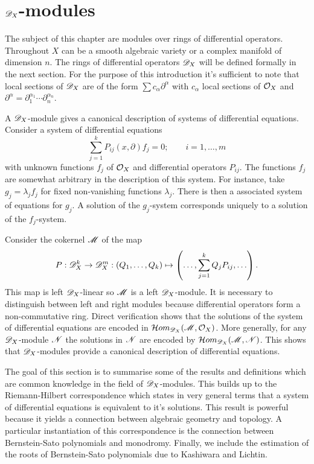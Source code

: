 \chapter{$\mathscr{D}_X$-modules}\label{Ch: ChapterDX}
The subject of this chapter are modules over rings of differential operators.
Throughout $X$ can be a smooth algebraic variety or a complex manifold of dimension $n$.
The rings of differential operators $\mathscr{D}_X$ will be defined formally in the next section.
For the purpose of this introduction it's sufficient to note that local sections of $\mathscr{D}_X$ are of the form $\sum c_{\alpha } \partial^\alpha$ with $c_{\alpha}$ local sections of $\mathcal{O}_X$ and $\partial^\alpha = \partial_1^{\alpha_1}\cdots \partial_n^{\alpha_n}$.

A $\mathscr{D}_X$-module gives a canonical description of systems of differential equations.
Consider a system of differential equations
$$\sum_{j=1}^k P_{ij}(x,\partial) f_j = 0; \qquad i= 1,\ldots,m$$
with unknown functions $f_j$ of $\mathcal{O}_X$ and differential operators $P_{ij}$.
The functions $f_j$ are somewhat arbitrary in the description of this system.
For instance, take $g_j=\lambda_j f_j$ for fixed non-vanishing functions $\lambda_j$.
There is then a associated system of equations for $g_j$.
A solution of the $g_j$-system corresponds uniquely to a solution of the $f_j$-system.

Consider the cokernel $\mathscr{M}$ of the map
$$P:\mathscr{D}_X^k \to \mathscr{D}_X^m : \left(Q_1,\ldots, Q_k\right) \mapsto \left(\ldots, \sum_{j=1}^k Q_j P_{ij},\ldots\right).$$
This map is left $\mathscr{D}_X$-linear so $\mathscr{M}$ is a left $\mathscr{D}_X$-module.
It is necessary to distinguish between left and right modules because differential operators form a non-commutative ring.
Direct verification shows that the solutions of the system of differential equations are encoded in $\mathcal{H}om_{\mathscr{D}_X}(\mathscr{M},\mathcal{O}_X)$.
More generally, for any $\mathscr{D}_X$-module $\mathscr{N}$ the solutions in $\mathscr{N}$ are encoded by $\mathcal{H}om_{\mathscr{D}_X}(\mathscr{M},\mathscr{N})$.
This shows that $\mathscr{D}_X$-modules provide a canonical description of differential equations.

The goal of this section is to summarise some of the results and definitions which are common knowledge in the field of $\mathscr{D}_X$-modules.
This builds up to the Riemann-Hilbert correspondence which states in very general terms that a system of differential equations is equivalent to it's solutions.
This result is powerful because it yields a connection between algebraic geometry and topology.
A particular instantiation of this correspondence is the connection between Bernstein-Sato polynomials and monodromy.
Finally, we include the estimation of the roots of Bernstein-Sato polynomials due to Kashiwara and Lichtin.

